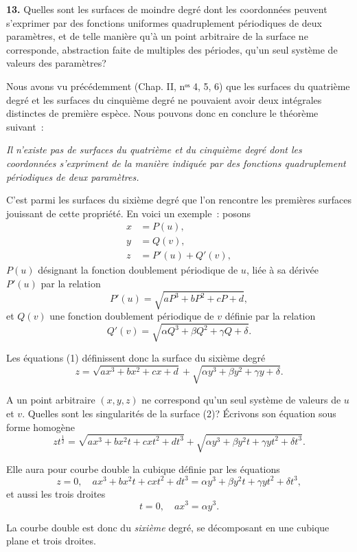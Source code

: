 \documentclass{article}
\begin{document}
\textbf{13.} Quelles sont les surfaces de moindre degré dont les coordonnées peuvent s'exprimer par des fonctions uniformes quadruplement périodiques de deux paramètres, et de telle manière qu'à un point arbitraire de la surface ne corresponde, abstraction faite de multiples des périodes, qu'un seul système de valeurs des paramètres?

Nous avons vu précédemment (Chap. II, nᵒˢ 4, 5, 6) que les surfaces du quatrième degré et les surfaces du cinquième degré ne pouvaient avoir deux intégrales distinctes de première espèce. Nous pouvons donc en conclure le théorème suivant~:

\emph{Il n'existe pas de surfaces du quatrième et du cinquième degré dont les coordonnées s'expriment de la manière indiquée par des fonctions quadruplement périodiques de deux paramètres.}

C'est parmi les surfaces du sixième degré que l'on rencontre les premières surfaces jouissant de cette propriété. En voici un exemple~: posons
\[
\begin{aligned}
x &= P(u), \\
y &= Q(v), \\
z &= P'(u) + Q'(v),
\end{aligned}
\tag{1}
\]
$P(u)$ désignant la fonction doublement périodique de $u$, liée à sa dérivée $P'(u)$ par la relation
\[
P'(u) = \sqrt{aP^{3} + bP^{2} + cP + d},
\]
et $Q(v)$ une fonction doublement périodique de $v$ définie par la relation
\[
Q'(v) = \sqrt{\alpha Q^{3} + \beta Q^{2} + \gamma Q + \delta}.
\]

Les équations (1) définissent donc la surface du sixième degré
\[
z = \sqrt{ax^{3} + bx^{2} + cx + d} + \sqrt{\alpha y^{3} + \beta y^{2} + \gamma y + \delta}. \tag{2}
\]

A un point arbitraire $(x, y, z)$ ne correspond qu'un seul système de valeurs de $u$ et $v$. Quelles sont les singularités de la surface (2)? Écrivons son équation sous forme homogène
\[
zt^{\frac{1}{2}} = \sqrt{ax^{3} + bx^{2}t + cxt^{2} + dt^{3}} + \sqrt{\alpha y^{3} + \beta y^{2}t + \gamma yt^{2} + \delta t^{3}}.
\]

Elle aura pour courbe double la cubique définie par les équations
\[
z = 0, \quad ax^{3} + bx^{2}t + cxt^{2} + dt^{3} = \alpha y^{3} + \beta y^{2}t + \gamma yt^{2} + \delta t^{3},
\]
et aussi les trois droites
\[
t = 0, \quad ax^{3} = \alpha y^{3}.
\]

La courbe double est donc du \emph{sixième} degré, se décomposant en une cubique plane et trois droites.
\end{document}

